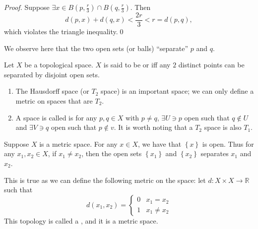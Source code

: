 \documentclass[notoc,notitlepage]{tufte-book}
\begin{document}
\begin{proof}
  Suppose $\exists x \in B \left( p, \frac{r}{3} \right) \cap B \left( q, \frac{r}{3} \right)$.
  Then
  \begin{equation*}
    d(p, x) + d(q, x) < \frac{2r}{3} < r = d(p, q),
  \end{equation*}
  which violates the triangle inequality.\qed\
\end{proof}

We observe here that the two open sets (or balls) ``separate'' $p$ and $q$.

\begin{defn}[Hausdorff / $T_2$]\label{defn:hausdorff_t_2_}
  Let $X$ be a topological space. $X$ is said to be \hlnoteb{Hausdorff} or 
  iff any $2$ distinct points can be separated by disjoint open sets.
\end{defn}

\begin{note}
  \begin{enumerate}
    \item The Hausdorff space (or $T_2$ space) is an important space;
      we can only define a metric on spaces that are $T_2$.
    \item A space is called  is for any $p, q \in X$ with $p \neq q$,
      $\exists U \ni p$ open such that $q \notin U$ and $\exists V \ni q$ open
      such that $p \notin v$. It is worth noting that a $T_2$ space is also
      $T_1$.
  \end{enumerate}
\end{note}

\begin{eg}
  Suppose $X$ is a metric space. For any $x \in X$, we have that $\left\{ x \right\}$ is open.
  Thus for any $x_1, x_2 \in X$, if $x_1 \neq x_2$, then the open sets
  $\left\{ x_1 \right\}$ and $\left\{ x_2 \right\}$ separates $x_1$ and $x_2$.

  This is true as we can define the following metric on the space:
  let $d : X \times X \to \mathbb{R}$ such that
  \begin{equation*}
    d(x_1, x_2) = \begin{cases}
      0 & x_1 = x_2 \\
      1 & x_1 \neq x_2
    \end{cases}
  \end{equation*}
  This topology is called a , and it is a metric space.
\end{eg}
\end{document}
